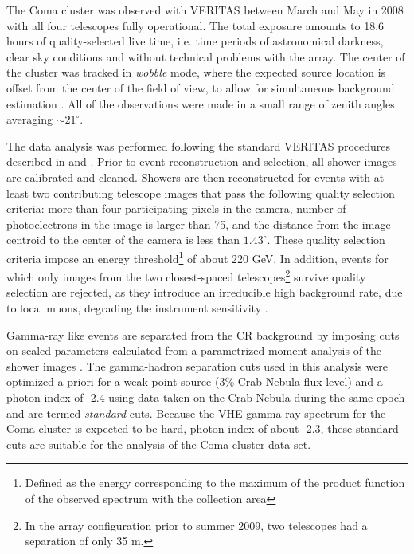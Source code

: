 \documentclass[12pt,manuscript]{aastex}
\begin{document}
The Coma cluster was observed with VERITAS between March and May in 2008 with all four telescopes fully operational. The total exposure amounts to 18.6 hours of quality-selected live time, i.e. time periods of astronomical darkness, clear sky conditions and without technical problems with the array. The center of the cluster was tracked in \emph{wobble} mode, where the expected source location is offset from the center of the field of view, to allow for simultaneous background estimation \citep{article:Formin_etal:1994}. All of the observations were made in a small range of zenith angles averaging $\sim 21^{\circ}$.

The data analysis was performed following the standard VERITAS procedures described in \citet{inproc:Cogan_etal:2007} and \citet{inproc:Daniel_etal:2007}. Prior to event reconstruction and selection, all shower images are calibrated and cleaned. Showers are then reconstructed for events with at least two contributing telescope images that pass the following quality selection criteria: more than four participating pixels in the camera, number of photoelectrons in the image is larger than 75, and the distance from the image centroid to the center of the camera is less than $1.43^{\circ}$. These quality selection criteria impose an energy threshold\footnote{Defined as the energy corresponding to the maximum of the product function of the observed spectrum with the collection area} of about 220 GeV. In addition, events for which only images from the two closest-spaced telescopes\footnote{In the array configuration prior to summer 2009, two telescopes had a separation of only 35 m.} survive quality selection are rejected, as they introduce an irreducible high background rate, due to local muons, degrading the instrument sensitivity \citep{article:MaierKnapp:2007}.

Gamma-ray like events are separated from the CR background by imposing cuts on scaled parameters \citep{article:Aharonian_etal:1997, article:Krawczynski_etal:2006} calculated from a parametrized moment analysis of the shower images \citep{inproc:Hillas:1985}. The gamma-hadron separation cuts used in this analysis were optimized a priori for a weak point source (3\% Crab Nebula flux level) and a photon index of -2.4 using data taken on the Crab Nebula during the same epoch and are termed \emph{standard} cuts. Because the VHE gamma-ray spectrum for the Coma cluster is expected to be hard, photon index of about -2.3, these standard cuts are suitable for the analysis of the Coma cluster data set. 
\end{document}
